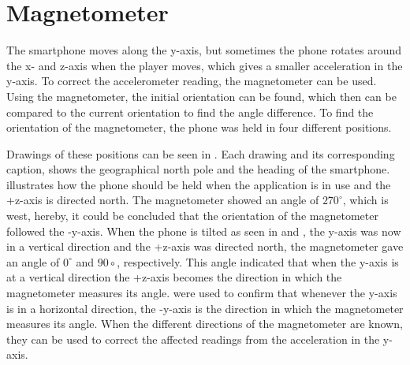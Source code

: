 \section{Magnetometer}\label{section:magnetometer}
The smartphone moves along the y-axis, but sometimes the phone rotates around the x- and z-axis when the player moves, which gives a smaller acceleration in the y-axis. 
To correct the accelerometer reading, the magnetometer can be used.
Using the magnetometer, the initial orientation can be found, which then can be compared to the current orientation to find the angle difference.
To find the orientation of the magnetometer, the phone was held in four different positions. 

Drawings of these positions can be seen in .
Each drawing and its corresponding caption, shows the geographical north pole and the heading of the smartphone.
 illustrates how the phone should be held when the application is in use and the +z-axis is directed north. 
The magnetometer showed an angle of $270^\circ$, which is west, hereby, it could be concluded that the orientation of the magnetometer followed the -y-axis.
When the phone is tilted as seen in  and , the y-axis was now in a vertical direction and the +z-axis was directed north, the magnetometer gave an angle of $0^\circ$ and $90\circ$, respectively. 
This angle indicated that when the y-axis is at a vertical direction the +z-axis becomes the direction in which the magnetometer measures its angle.
 were used to confirm that whenever the y-axis is in a horizontal direction, the -y-axis is the direction in which the magnetometer measures its angle.
When the different directions of the magnetometer are known, they can be used to correct the affected readings from the acceleration in the y-axis.


